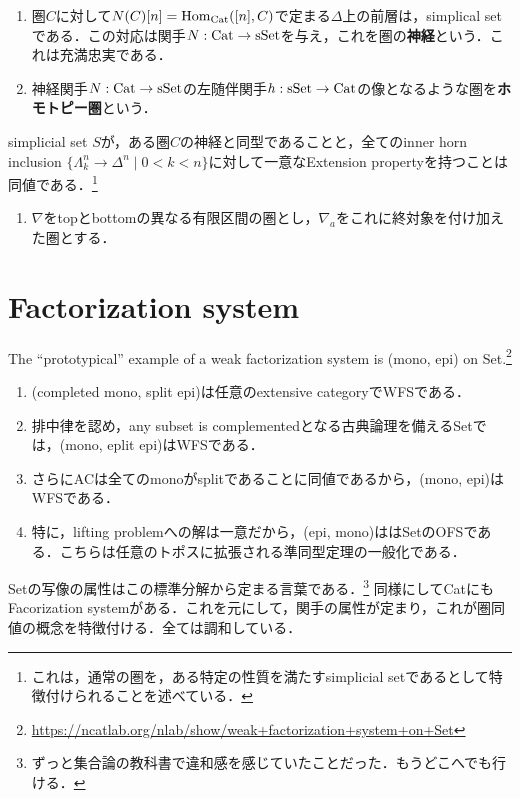 \documentclass[uplatex,dvipdfmx]{jsreport}
\begin{document}
\begin{definition}\mbox{}
    \begin{enumerate}
        \item 圏$C$に対して$N(C)[n]=\mathrm{Hom}_{\mathrm{Cat}}([n],C)$で定まる$\Delta$上の前層は，simplical setである．この対応は関手$N:\mathrm{Cat}\to\mathrm{sSet}$を与え，これを圏の\textbf{神経}という．これは充満忠実である．
        \item 神経関手$N:\mathrm{Cat}\to\mathrm{sSet}$の左随伴関手$h:\mathrm{sSet}\to\mathrm{Cat}$の像となるような圏を\textbf{ホモトピー圏}という．
    \end{enumerate}
\end{definition}

\begin{proposition}
    simplicial set $S$が，ある圏$C$の神経と同型であることと，全てのinner horn inclusion $\{\Lambda^n_k\to\Delta^n\mid 0<k<n\}$に対して一意なExtension propertyを持つことは同値である．\footnote{これは，通常の圏を，ある特定の性質を満たすsimplicial setであるとして特徴付けられることを述べている．}
\end{proposition}

\begin{definition}\mbox{}
    \begin{enumerate}
        \item $\nabla$をtopとbottomの異なる有限区間の圏とし，$\nabla_a$をこれに終対象を付け加えた圏とする．
    \end{enumerate}
\end{definition}

\section{Factorization system}

\begin{tcolorbox}[colframe=ForestGreen, colback=ForestGreen!10!white, breakable ,colbacktitle=ForestGreen!40!white, coltitle=black,fonttitle=\bfseries\sffamily,
    title=]
    The “prototypical” example of a weak factorization system is (mono, epi) on Set.\footnote{\url{https://ncatlab.org/nlab/show/weak+factorization+system+on+Set}}
    \begin{enumerate}
        \item (completed mono, split epi)は任意のextensive categoryでWFSである．
        \item 排中律を認め，any subset is complementedとなる古典論理を備えるSetでは，(mono, eplit epi)はWFSである．
        \item さらにACは全てのmonoがsplitであることに同値であるから，(mono, epi)はWFSである．
        \item 特に，lifting problemへの解は一意だから，(epi, mono)ははSetのOFSである．こちらは任意のトポスに拡張される準同型定理の一般化である．
    \end{enumerate}
    Setの写像の属性はこの標準分解から定まる言葉である．\footnote{ずっと集合論の教科書で違和感を感じていたことだった．もうどこへでも行ける．}
    同様にしてCatにもFacorization systemがある．これを元にして，関手の属性が定まり，これが圏同値の概念を特徴付ける．全ては調和している．
\end{tcolorbox}
\end{document}

